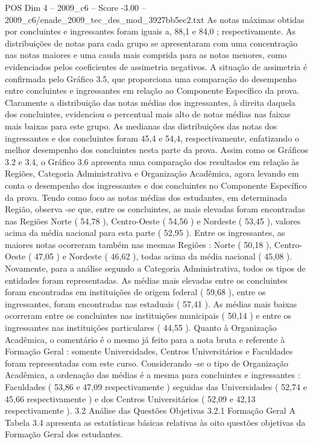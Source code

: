 \begin{textsample}{POS Dim 4 – 2009\_c6 – Score -3.00 – 2009\_c6/enade\_2009\_tec\_des\_mod\_3927bb5ec2.txt}
As notas máximas obtidas por concluintes e ingressantes foram iguais a, 88,1 e 84,0 ; respectivamente.
As distribuições de notas para cada grupo se apresentaram com uma concentração nas notas maiores e uma cauda mais comprida para as notas menores, como evidenciados pelos coeficientes de assimetria negativos.
A situação de assimetria é confirmada pelo Gráfico 3.5, que proporciona uma comparação do desempenho entre concluintes e ingressantes em relação ao Componente Específico da prova.
Claramente a distribuição das notas médias dos ingressantes, à direita daquela dos concluintes, evidenciou o percentual mais alto de notas médias nas faixas mais baixas para este grupo.
As medianas das distribuições das notas dos ingressantes e dos concluintes foram 45,4 e 54,4, respectivamente, enfatizando o melhor desempenho dos concluintes nesta parte da prova.
Assim como os Gráficos 3.2 e 3.4, o Gráfico 3.6 apresenta uma comparação dos resultados em relação às Regiões, Categoria Administrativa e Organização Acadêmica, agora levando em conta o desempenho dos ingressantes e dos concluintes no Componente Específico da prova.
Tendo como foco as notas médias dos estudantes, em determinada Região, observa -se que, entre os concluintes, as mais elevadas foram encontradas nas Regiões Norte ( 54,78 ), Centro-Oeste ( 54,56 ) e Nordeste ( 53,45 ), valores acima da média nacional para esta parte ( 52,95 ).
Entre os ingressantes, as maiores notas ocorreram também nas mesmas Regiões : Norte ( 50,18 ), Centro-Oeste ( 47,05 ) e Nordeste ( 46,62 ), todas acima da média nacional ( 45,08 ).
Novamente, para a análise segundo a Categoria Administrativa, todos os tipos de entidades foram representadas.
As médias mais elevadas entre os concluintes foram encontradas em instituições de origem federal ( 59,68 ), entre os ingressantes, foram encontradas nas estaduais ( 57,41 ).
As médias mais baixas ocorreram entre os concluintes nas instituições municipais ( 50,14 ) e entre os ingressantes nas instituições particulares ( 44,55 ).
Quanto à Organização Acadêmica, o comentário é o mesmo já feito para a nota bruta e referente à Formação Geral : somente Universidades, Centros Universitários e Faculdades foram representadas com este curso.
Considerando -se o tipo de Organização Acadêmica, a ordenação das médias é a mesma para concluintes e ingressantes : Faculdades ( 53,86 e 47,09 respectivamente ) seguidas das Universidades ( 52,74 e 45,66 respectivamente ) e dos Centros Universitários ( 52,09 e 42,13 respectivamente ). 3.2 Análise das Questões Objetivas 3.2.1 Formação Geral A Tabela 3.4 apresenta as estatísticas básicas relativas às oito questões objetivas da Formação Geral dos estudantes.

\end{textsample}

